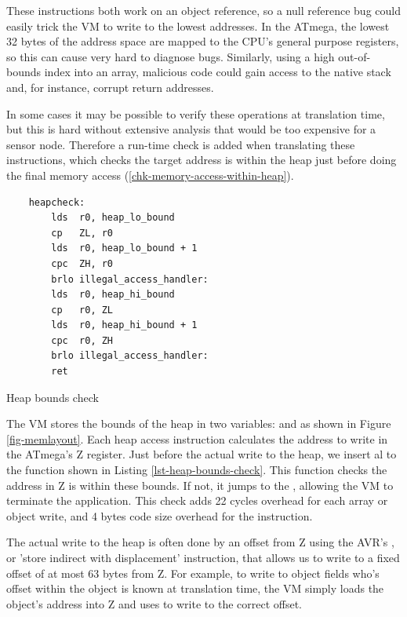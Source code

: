 These instructions both work on an object reference, so a null reference bug could easily trick the VM to write to the lowest addresses. In the ATmega, the lowest 32 bytes of the address space are mapped to the CPU's general purpose registers, so this can cause very hard to diagnose bugs. Similarly, using a high out-of-bounds index into an array, malicious code could gain access to the native stack and, for instance, corrupt return addresses.

In some cases it may be possible to verify these operations at translation time, but this is hard without extensive analysis that would be too expensive for a sensor node. Therefore a run-time check is added when translating these instructions, which checks the target address is within the heap just before doing the final memory access (\ref{chk-memory-access-within-heap}).

\begin{listing}
    \centering
    \begin{verbatim}
    heapcheck:
        lds  r0, heap_lo_bound
        cp   ZL, r0
        lds  r0, heap_lo_bound + 1
        cpc  ZH, r0
        brlo illegal_access_handler:
        lds  r0, heap_hi_bound
        cp   r0, ZL
        lds  r0, heap_hi_bound + 1
        cpc  r0, ZH
        brlo illegal_access_handler:
        ret
    \end{verbatim}
    \caption{Heap bounds check}
    \label{lst-heap-bounds-check}
\end{listing}

The VM stores the bounds of the heap in two variables:  and  as shown in Figure \ref{fig-memlayout}. Each heap access instruction calculates the address to write in the ATmega's Z register. Just before the actual write to the heap, we insert al  to the  function shown in Listing \ref{lst-heap-bounds-check}. This function checks the address in Z is within these bounds. If not, it jumps to the , allowing the VM to terminate the application. This check adds 22 cycles overhead for each array or object write, and 4 bytes code size overhead for the  instruction.

The actual write to the heap is often done by an offset from Z using the AVR's , or 'store indirect with displacement' instruction, that allows us to write to a fixed offset of at most 63 bytes from Z. For example, to write to object fields who's offset within the object is known at translation time, the VM simply loads the object's address into Z and uses  to write to the correct offset.

